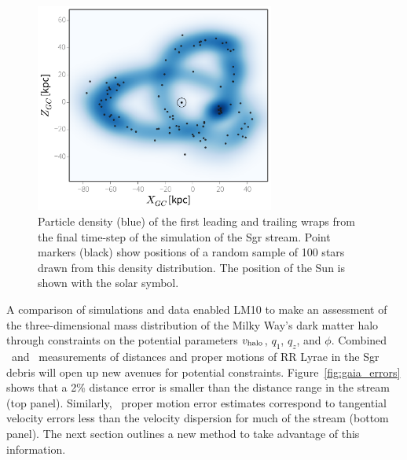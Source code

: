 \begin{figure}[t]
\begin{center}
\includegraphics[width=0.7\textwidth]{figures/ch1/fig2.pdf}
\caption{ Particle density (blue) of the first leading and trailing wraps from
the final time-step of the \citet{law10} simulation of the Sgr stream. Point
markers (black) show positions of a random sample of 100 stars drawn from this
density distribution. The position of the Sun is shown with the solar symbol. }
\label{fig:lm10}
\end{center}
\end{figure}

A comparison of simulations and data enabled LM10 to make an assessment of the
three-dimensional mass distribution of the Milky Way's dark matter halo through
constraints on the potential parameters $v_{\rm halo}$, $q_1$, $q_z$, and
$\phi$. Combined \spitzer\ and \gaia\ measurements of distances and
proper motions of RR Lyrae in the Sgr debris will open up new avenues for
potential constraints. Figure~\ref{fig:gaia_errors} shows that a 2\% distance
error is smaller than the distance range in the stream (top panel). Similarly,
\gaia\ proper motion error estimates correspond to tangential velocity
errors less than the velocity dispersion for much of the stream (bottom panel).
The next section outlines a new method to take advantage of this information.


